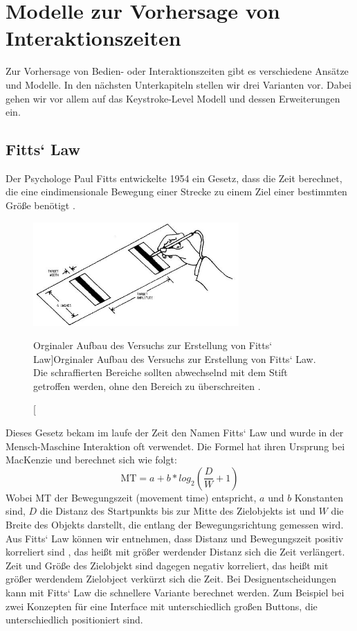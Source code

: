 \section[Vorhersagemodelle]{Modelle zur Vorhersage von Interaktionszeiten}
Zur Vorhersage von Bedien- oder Interaktionszeiten gibt es verschiedene Ansätze und Modelle. 
In den nächsten Unterkapiteln stellen wir drei Varianten vor. 
Dabei gehen wir vor allem auf das Keystroke-Level Modell und dessen Erweiterungen ein. 

\subsection[Fitts` Law]{Fitts` Law}
Der Psychologe Paul Fitts entwickelte 1954 ein Gesetz, dass die Zeit berechnet, die eine eindimensionale Bewegung einer Strecke zu einem Ziel einer bestimmten Größe benötigt \citep{fitts1954information}. 
\begin{figure}
	\centering
		\includegraphics[width=0.7\textwidth]{img/FittsLaw.JPG}
	\caption[Orginaler Aufbau des Versuchs zur Erstellung von Fitts` Law]{Orginaler Aufbau des Versuchs zur Erstellung von Fitts` Law. 
	Die schraffierten Bereiche sollten abwechselnd mit dem Stift getroffen werden, ohne den Bereich zu überschreiten \citep{fitts1954information}. }
	\label{fig:FittsLaw}
\end{figure}

Dieses Gesetz bekam im laufe der Zeit den Namen Fitts` Law und wurde in der Mensch-Maschine Interaktion oft verwendet. 
Die Formel hat ihren Ursprung bei MacKenzie \citep{MacKenzie:1992} und berechnet sich wie folgt:
\[
\text{MT} = a+b * log_2 (\frac{D}{W}+1)
\]
Wobei MT der Bewegungszeit (movement time) entspricht, $a$ und $b$ Konstanten sind, $D$ die Distanz des Startpunkts bis zur Mitte des Zielobjekts ist und $W$ die Breite des Objekts darstellt, die entlang der Bewegungsrichtung gemessen wird. 
Aus Fitts` Law können wir entnehmen, dass Distanz und Bewegungszeit positiv korreliert sind , das heißt mit größer werdender Distanz sich die Zeit verlängert.
Zeit und Größe des Zielobjekt sind dagegen negativ korreliert, das heißt mit größer werdendem Zielobject verkürzt sich die Zeit.
Bei Designentscheidungen kann mit Fitts` Law die schnellere Variante berechnet werden. 
Zum Beispiel bei zwei Konzepten für eine Interface mit unterschiedlich großen Buttons, die unterschiedlich positioniert sind. 

